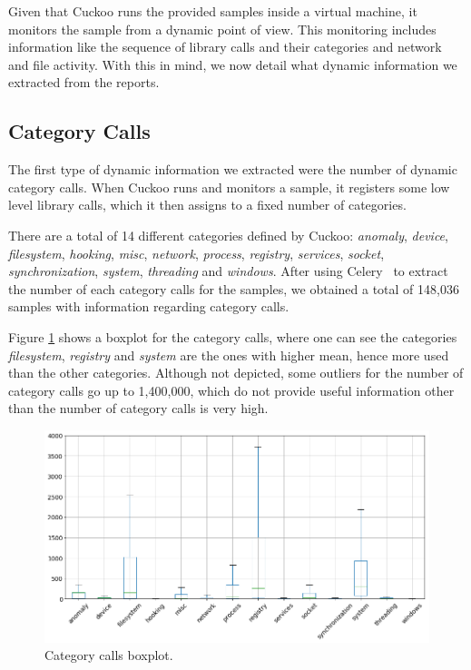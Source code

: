Given that Cuckoo runs the provided samples inside a virtual machine, it monitors the sample from a dynamic point of view.
This monitoring includes information like the sequence of library calls and their categories and network and file activity.
With this in mind, we now detail what dynamic information we extracted from the reports.

\subsection{Category Calls}
\label{section:improvements_categories}

The first type of dynamic information we extracted were the number of dynamic category calls.
When Cuckoo runs and monitors a sample, it registers some low level library calls, which it then assigns to a fixed number of categories.

There are a total of 14 different categories defined by Cuckoo: \textit{anomaly}, \textit{device}, \textit{filesystem}, \textit{hooking}, \textit{misc}, \textit{network}, \textit{process}, \textit{registry}, \textit{services}, \textit{socket}, \textit{synchronization}, \textit{system}, \textit{threading} and \textit{windows}.
After using Celery~\cite{tool:celery} to extract the number of each category calls for the samples, we obtained a total of 148,036 samples with information regarding category calls.

Figure \ref{fig:boxplot_category_calls} shows a boxplot for the category calls, where one can see the categories \textit{filesystem}, \textit{registry} and \textit{system} are the ones with higher mean, hence more used than the other categories.
Although not depicted, some outliers for the number of category calls go up to 1,400,000, which do not provide useful information other than the number of category calls is very high.

\begin{figure}[!htb]
	\centering
	\includegraphics[width=\textwidth]{Figures/boxplot_category_calls.png}
	\caption{Category calls boxplot.}
	\label{fig:boxplot_category_calls}
\end{figure}

